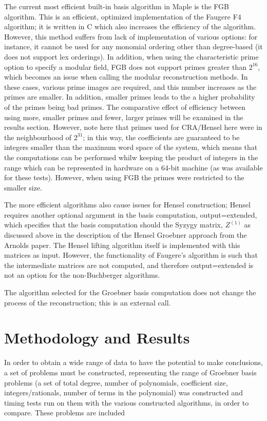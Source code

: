 \documentclass[letterpaper,12pt,titlepage,oneside,final]{book}
\begin{document}
The current most efficient built-in basis algorithm in Maple is the FGB algorithm.  This is an efficient, optimized implementation of the Faugere F4 algorithm; it is written in C which also increases the efficiency of the algorithm.  However, this method suffers from lack of implementation of various options: for instance, it cannot be used for any monomial ordering other than degree-based (it does not support lex orderings).  In addition, when using the characteristic prime option to specify a modular field, FGB does not support primes greater than ${2^{16}}$, which becomes an issue when calling the modular reconstruction methods.  In these cases, various prime images are required, and this number increases as the primes are smaller.  In addition, smaller primes leads to the a higher probability of the primes being bad primes.  The comparative effect of efficiency between using more, smaller primes and fewer, larger primes will be examined in the results section.  However, note here that primes used for CRA/Hensel here were in the neighbourhood of ${2^{31}}$; in this way, the coefficients are guaranteed to be integers smaller than the maximum word space of the system, which means that the computations can be performed whilw keeping the product of integers in the range which can be represented in hardware on a 64-bit machine (as was available for these tests).  However, when using FGB the primes were restricted to the smaller size.

The more efficient algorithms also cause issues for Hensel construction; Hensel requires another optional argument in the basis computation, output=extended, which specifies that the basis computation should the Syzygy matrix, ${Z^{(1)}}$ as discussed above in the description of the Hensel Groebner approach from the Arnolds paper.  The Hensel lifting algorithm itself is implemented with this matrices as input.  However, the functionality of Faugere's algorithm is such that the intermediate matrices are not computed, and therefore output=extended is not an option for the non-Buchberger algorithms.  

The algorithm selected for the Groebner basis computation does not change the process of the reconstruction; this is an external call.

\chapter{Methodology and Results}

In order to obtain a wide range of data to have the potential to make conclusions, a set of problems must be constructed, representing the range of Groebner basis problems (a set of total degree, number of polynomials, coefficient size, integers/rationals, number of terms in the polynomial) was constructed and timing tests run on them with the various constructed algorithms, in order to compare.  These problems are included 
\end{document}
